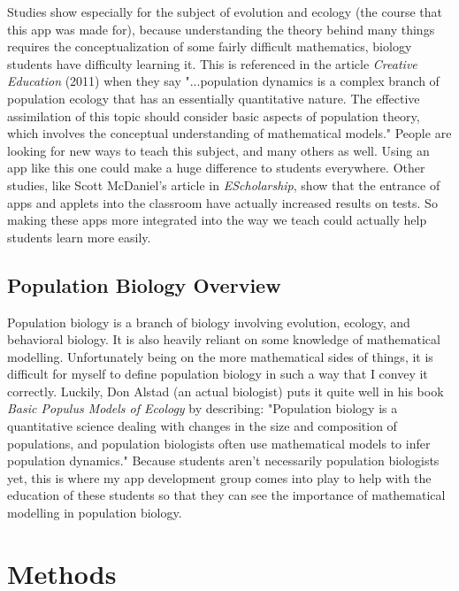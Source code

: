 \documentclass[titlepage]{article}\usepackage[]{graphicx}\usepackage[]{color}
\begin{document}
Studies show especially for the subject of evolution and ecology (the course that this app was made for), because understanding the theory behind many things requires the conceptualization of some fairly difficult mathematics, biology students have difficulty learning it. This is referenced in the article \textit{Creative Education} (2011) when they say "...population dynamics is a complex branch of population ecology that has an essentially quantitative nature. The effective assimilation of this topic should consider basic aspects of population theory, which involves the conceptual understanding of mathematical models." People are looking for new ways to teach this subject, and many others as well. Using an app like this one could make a huge difference to students everywhere. Other studies, like Scott McDaniel's article in \textit{EScholarship}, show that the entrance of apps and applets into the classroom have actually increased results on tests. So making these apps more integrated into the way we teach could actually help students learn more easily.

\subsection{Population Biology Overview}

Population biology is a branch of biology involving evolution, ecology, and behavioral biology. It is also heavily reliant on some knowledge of mathematical modelling. Unfortunately being on the more mathematical sides of things, it is difficult for myself to define population biology in such a way that I convey it correctly. Luckily, Don Alstad (an actual biologist) puts it quite well in his book \textit{Basic Populus Models of Ecology} by describing: "Population biology is a quantitative science dealing with changes in the size and composition of populations, and population biologists often use mathematical models to infer population dynamics." Because students aren't necessarily population biologists yet, this is where my app development group comes into play to help with the education of these students so that they can see the importance of mathematical modelling in population biology.




\section{Methods}
\end{document}
